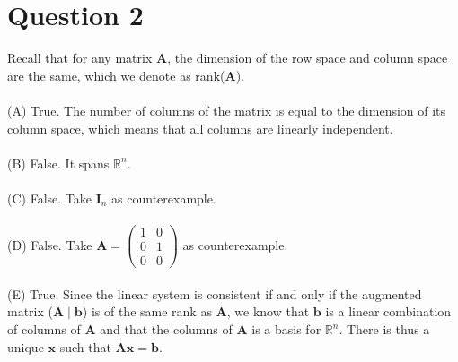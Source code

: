 \documentclass{article}
\begin{document}
\section*{Question 2}
Recall that for any matrix $\boldsymbol{A}$, the dimension of the row space and column space are the same, which we denote as rank($\boldsymbol{A}$). \\\\
(A) True. The number of columns of the matrix is equal to the dimension of its column space, which means that all columns are linearly independent. \\\\
(B) False. It spans $\mathbb{R}^n$. \\\\
(C) False. Take $\mathbf{I}_n$ as counterexample. \\\\
(D) False. Take 
$\mathbf{A} = \begin{pmatrix}
1 & 0 \\
0 & 1 \\
0 & 0
\end{pmatrix}$ as counterexample. \\\\
(E) True. Since the linear system is consistent if and only if the augmented matrix ($\mathbf{A} \mid \mathbf{b}$) is of the same rank as $\mathbf{A}$, we know that $\mathbf{b}$ is a linear combination of columns of $\mathbf{A}$ and that the columns of $\mathbf{A}$ is a basis for $\mathbb{R}^n$. There is thus a unique $\mathbf{x}$ such that $\mathbf{A} \mathbf{x}= \mathbf{b}$.
\end{document}
